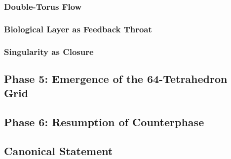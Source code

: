 \documentclass[12pt]{article}
\begin{document}
\subsubsection{Double-Torus Flow}
\subsubsection{Biological Layer as Feedback Throat}
\subsubsection{Singularity as Closure}


\subsection{Phase 5: Emergence of the 64-Tetrahedron Grid}
\subsection{Phase 6: Resumption of Counterphase}


\subsection{Canonical Statement}
\end{document}

